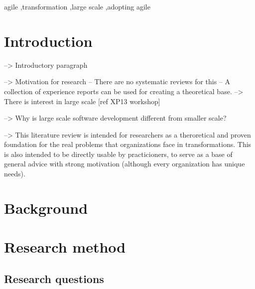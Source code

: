 \documentclass[preprint,authoryear,12pt]{elsarticle}
\begin{document}
\begin{frontmatter}
\begin{abstract}
\end{abstract}

\begin{keyword}

agile \sep transformation \sep large scale \sep adopting agile

\end{keyword}

\end{frontmatter}




\section{Introduction}

--> Introductory paragraph

--> Motivation for research
-- There are no systematic reviews for this
-- A collection of experience reports can be used for creating a theoretical
   base.
--> There is interest in large scale [ref XP13 workshop]


--> Why is large scale software development different from smaller scale?

--> This literature review is intended for researchers as a theroretical
   and proven foundation for the real problems that organizations face in
   transformations.
   This is also intended to be directly usable by practicioners, to serve as a
   base of general advice with strong motivation (although every organization
   has unique needs).

\section{Background}
\label{sec:background}


\section{Research method}
\label{sec:method}

\subsection{Research questions}
\end{document}
